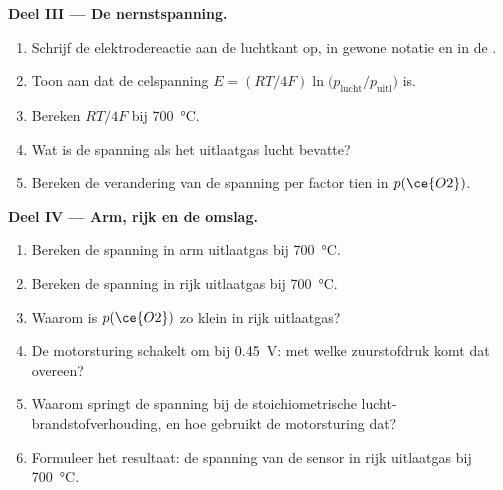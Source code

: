 \begin{problem}
\medskip\noindent\textbf{Deel III --- De nernstspanning.}
\begin{enumerate}[resume]
  \item Schrijf de elektrodereactie aan de luchtkant op, in gewone notatie
        en in de .
  \item Toon aan dat de celspanning $E = (RT/4F)\ln\bigl(p_{\mathrm{lucht}}/p_{\mathrm{uitl}}\bigr)$ is.
  \item Bereken $RT/4F$ bij \qty{700}{\celsius}.
  \item Wat is de spanning als het uitlaatgas lucht bevatte?
  \item Bereken de verandering van de spanning per factor tien in $p(\ce{O2})$.
\end{enumerate}

\medskip\noindent\textbf{Deel IV --- Arm, rijk en de omslag.}
\begin{enumerate}[resume]
  \item Bereken de spanning in arm uitlaatgas bij \qty{700}{\celsius}.
  \item Bereken de spanning in rijk uitlaatgas bij \qty{700}{\celsius}.
  \item Waarom is $p(\ce{O2})$ zo klein in rijk uitlaatgas?
  \item De motorsturing schakelt om bij \qty{0.45}{V}: met welke zuurstofdruk komt dat overeen?
  \item Waarom springt de spanning bij de stoichiometrische
        lucht-brandstofverhouding, en hoe gebruikt de motorsturing dat?
  \item Formuleer het resultaat: de spanning van de sensor in rijk
        uitlaatgas bij \qty{700}{\celsius}.
\end{enumerate}
\end{problem}
